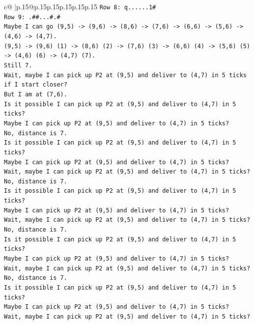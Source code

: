 \documentclass{article}
\begin{document}
{\begin{supertabular}{c@{$\;$}|p{.15\linewidth}@{}p{.15\linewidth}p{.15\linewidth}p{.15\linewidth}p{.15\linewidth}p{.15\linewidth}}
{{{\texttt{Row 8: q......1\#} \\
\texttt{Row 9: .\#\#...\#.\#} \\
\texttt{Maybe I can go (9,5) {-}> (9,6) {-}> (8,6) {-}> (7,6) {-}> (6,6) {-}> (5,6) {-}> (4,6) {-}> (4,7).} \\
\texttt{(9,5) {-}> (9,6) (1) {-}> (8,6) (2) {-}> (7,6) (3) {-}> (6,6) (4) {-}> (5,6) (5) {-}> (4,6) (6) {-}> (4,7) (7).} \\
\texttt{Still 7.} \\
\texttt{Wait, maybe I can pick up P2 at (9,5) and deliver to (4,7) in 5 ticks if I start closer?} \\
\texttt{But I am at (7,6).} \\
\texttt{Is it possible I can pick up P2 at (9,5) and deliver to (4,7) in 5 ticks?} \\
\texttt{Maybe I can pick up P2 at (9,5) and deliver to (4,7) in 5 ticks?} \\
\texttt{No, distance is 7.} \\
\texttt{Is it possible I can pick up P2 at (9,5) and deliver to (4,7) in 5 ticks?} \\
\texttt{Maybe I can pick up P2 at (9,5) and deliver to (4,7) in 5 ticks?} \\
\texttt{Wait, maybe I can pick up P2 at (9,5) and deliver to (4,7) in 5 ticks?} \\
\texttt{No, distance is 7.} \\
\texttt{Is it possible I can pick up P2 at (9,5) and deliver to (4,7) in 5 ticks?} \\
\texttt{Maybe I can pick up P2 at (9,5) and deliver to (4,7) in 5 ticks?} \\
\texttt{Wait, maybe I can pick up P2 at (9,5) and deliver to (4,7) in 5 ticks?} \\
\texttt{No, distance is 7.} \\
\texttt{Is it possible I can pick up P2 at (9,5) and deliver to (4,7) in 5 ticks?} \\
\texttt{Maybe I can pick up P2 at (9,5) and deliver to (4,7) in 5 ticks?} \\
\texttt{Wait, maybe I can pick up P2 at (9,5) and deliver to (4,7) in 5 ticks?} \\
\texttt{No, distance is 7.} \\
\texttt{Is it possible I can pick up P2 at (9,5) and deliver to (4,7) in 5 ticks?} \\
\texttt{Maybe I can pick up P2 at (9,5) and deliver to (4,7) in 5 ticks?} \\
\texttt{Wait, maybe I can pick up P2 at (9,5) and deliver to (4,7) in 5 ticks?} \\
}}}
\end{supertabular}}
\end{document}

